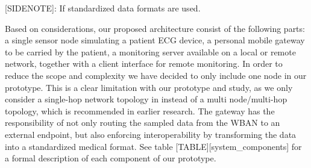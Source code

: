 [SIDENOTE]: If standardized data formats are used.

Based on considerations, our proposed architecture consist of the following parts: a single sensor node simulating a patient ECG device, a personal mobile gateway to be carried by the patient, a monitoring server available on a local or remote network, together with a client interface for remote monitoring. In order to reduce the scope and complexity we have decided to only include one node in our prototype. This is a clear limitation with our prototype and study, as we only consider a single-hop network topology in instead of a multi node/multi-hop topology, which is recommended in earlier research. The gateway has the responsibility of not only routing the sampled data from the WBAN to an external endpoint, but also enforcing interoperability by transforming the data into a standardized medical format. See table [TABLE][system_components] for a formal description of each component of our prototype.

